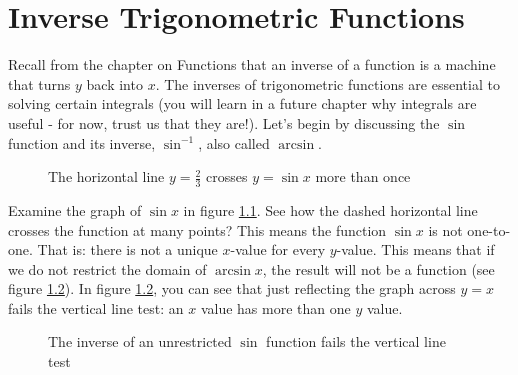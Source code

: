 \chapter{Inverse Trigonometric Functions}
Recall from the chapter on Functions that an inverse of a function is a machine that turns $y$ back into $x$. The inverses of trigonometric functions are essential to solving certain integrals (you will learn in a future chapter why integrals are useful - for now, trust us that they are!). Let's begin by discussing the $\sin$ function and its inverse, $\sin^{-1}$, also called $\arcsin$. 

\begin{figure}
	\caption{The horizontal line $y=\frac{2}{3}$ crosses $y = \sin{x}$ more than once}
	\label{fig:sinhline}
\end{figure}

Examine the graph of $\sin{x}$ in figure \ref{fig:sinhline}. See how the dashed horizontal line crosses the function at many points? This means the function $\sin{x}$ is not one-to-one. That is: there is not a unique $x$-value for every $y$-value. This means that if we do not restrict the domain of $\arcsin{x}$, the result will not be a function (see figure \ref{fig:arcsinvline}). In figure \ref{fig:arcsinvline}, you can see that just reflecting the graph across $y=x$ fails the vertical line test: an $x$ value has more than one $y$ value.

\begin{figure}
	\caption{The inverse of an unrestricted $\sin$ function fails the vertical line test}
	\label{fig:arcsinvline}
\end{figure} 

